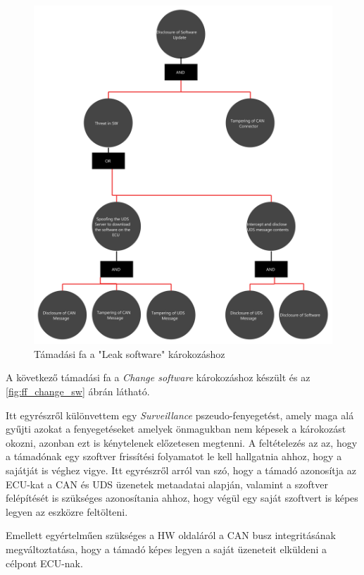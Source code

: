 \begin{figure}[!ht]
	\centering
	\includegraphics[width=120mm, keepaspectratio]{figures/AT-SECSW-00.png}
	\caption{Támadási fa a "Leak software" károkozáshoz} 
	\label{fig:ff_leak_sw}
\end{figure}

\newpage

A következő támadási fa a \textit{Change software} károkozáshoz készült és az \ref{fig:ff_change_sw} ábrán látható. 

Itt egyrészről különvettem egy \textit{Surveillance} pszeudo-fenyegetést, amely maga alá gyűjti azokat a fenyegetéseket amelyek önmagukban nem képesek a károkozást okozni, azonban ezt is kénytelenek előzetesen megtenni. A feltételezés az az, hogy a támadónak egy szoftver frissítési folyamatot le kell hallgatnia ahhoz, hogy a sajátját is véghez vigye. Itt egyrészről arról van szó, hogy a támadó azonosítja az ECU-kat a CAN és UDS üzenetek metaadatai alapján, valamint a szoftver felépítését is szükséges azonosítania ahhoz, hogy végül egy saját szoftvert is képes legyen az eszközre feltölteni.

Emellett egyértelműen szükséges a HW oldaláról a CAN busz integritásának megváltoztatása, hogy a támadó képes legyen a saját üzeneteit elküldeni a célpont ECU-nak.

